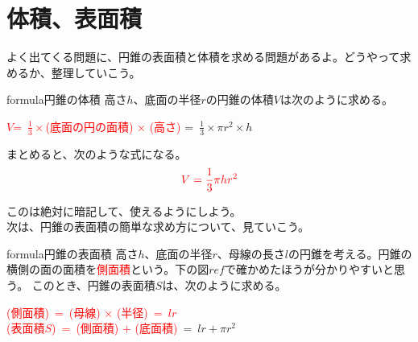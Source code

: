 \documentclass[11pt]{jsarticle}
\begin{document}
\section{体積、表面積}
よく出てくる問題に、円錐の表面積と体積を求める問題があるよ。どうやって求めるか、整理していこう。
\begin{statesp}[conevol]{formula}{円錐の体積}
高さ$h$、底面の半径$r$の円錐の体積$V$は次のように求める。
\begin{center}
\textcolor{red}{$V$=\ $\frac{1}{3} \times$(底面の円の面積) $\times$ (高さ)} =\ $\frac{1}{3} \times \pi r^2 \times h$ 
\end{center}
まとめると、次のような式になる。
\begin{equation}
\textcolor{red}{V=\frac{1}{3} \pi h r^2}
\end{equation}
\end{statesp}

このは絶対に暗記して、使えるようにしよう。\\
次は、円錐の表面積の簡単な求め方について、見ていこう。

\newpage

\begin{statesp}[conearea]{formula}{円錐の表面積}
高さ$h$、底面の半径$r$、母線の長さ$l$の円錐を考える。円錐の横側の面の面積を\textcolor{red}{側面積}という。下の図$ref$で確かめたほうが分かりやすいと思う。
このとき、円錐の表面積$S$は、次のように求める。
\begin{center}
\textcolor{red}{(側面積)\ =\ (母線) $\times$ (半径)\ =\ $lr$}\\
\textcolor{red}{(表面積$S$)\ =\ (側面積) $+$ (底面積)}\ =\ $lr + \pi r^2$
\end{center}
\end{statesp}
\end{document}
